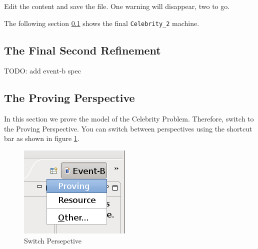 Edit the content and save the file. One warning will disappear, two to go.


The following section \ref{tut_08_final_celebrity} shows the final \texttt{Celebrity\_2} machine.

\subsection{The Final Second Refinement} \label{tut_08_final_celebrity}

TODO: add event-b spec

\subsection{The Proving Perspective}

In this section we prove the model of the Celebrity Problem. Therefore, switch to the Proving Perspective. You can switch between perspectives using the shortcut bar as shown in figure \ref{fig_tut_08_switch_perspective}. 

\begin{figure}[!h]
\begin{center}
	\includegraphics{img/tutorial/tut_08_switch_perspective.png}
	\caption{Switch Persepctive}
	\label{fig_tut_08_switch_perspective}
\end{center}
\end{figure}


